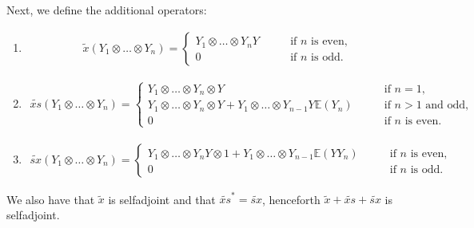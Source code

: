 \documentclass{amsart}
\begin{document}
Next, we define the additional operators:
\begin{enumerate}
	\item \begin{align*}
	\widetilde{x}\left(Y_1\otimes\ldots\otimes Y_n \right)=\begin{cases}
		Y_1\otimes\ldots\otimes Y_n Y\qquad &\mbox{if $n$ is even,}\\
		0 \qquad &\mbox{if $n$ is odd.}
	\end{cases}
\end{align*}
\item \begin{align*}
	\widetilde{xs}\left(Y_1\otimes\ldots\otimes Y_n\right)=\begin{cases}
		Y_1\otimes\ldots\otimes Y_n\otimes Y\qquad&\mbox{if $n=1$,}\\
		Y_1\otimes\ldots\otimes Y_n\otimes Y+Y_1\otimes\ldots\otimes Y_{n-1}Y\mathbb{E}(Y_n)\qquad &\mbox{if $n>1$ and odd,}\\
		0 \qquad &\mbox{if $n$ is even.}
	\end{cases}
\end{align*}
\item \begin{align*}
	\widetilde{sx}\left(Y_1\otimes\ldots\otimes Y_n\right)=\begin{cases}
		Y_1\otimes\ldots\otimes Y_n Y\otimes 1+Y_1\otimes\ldots\otimes Y_{n-1}\mathbb{E}(YY_n)\qquad &\mbox{if $n$ is even,}\\
		0 \qquad &\mbox{if $n$ is odd.}
	\end{cases}
\end{align*}
	\end{enumerate}

 We also have that $ \widetilde{x} $ is selfadjoint 
 and that 
 $ \widetilde{xs}^\ast  = \widetilde{sx} $, 
 henceforth
 $ \widetilde{x} + \widetilde{xs} + \widetilde{sx} $ 
 is selfadjoint.
 
\end{document}
